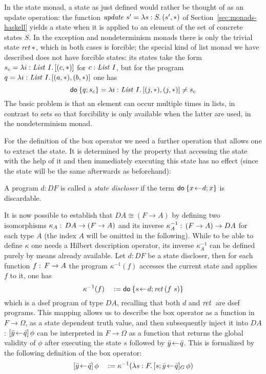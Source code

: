 In the state monad, a state as just defined would rather be thought of as an
update operation: the function $\mathit{update}\ s' = {\lambda s:S.\,(s',
  \ast)}$ of Section~\ref{sec:monads-haskell} yields a state when it is applied
to an element of the  set of concrete states $S$. In the exception and
nondeterminism monads there is only the trivial state $\mathit{ret\,} \ast$, which in
both cases is forcible; the special kind of list monad we have described does
not have forcible states: its states take the form $s_c = {\lambda i :
  \mathit{List}\ I.\,[(c, \ast)]}$ for $c : \mathit{List}\ I$, but for the program
$q = {\lambda i:\mathit{List}\ I.\,[(a, \ast), (b, \ast)]}$ one has
\[
  \mathsf{do}\: \{q; s_c\} = {\lambda i:\mathit{List}\ I.\,[(j,\ast), (j,\ast)]} \neq s_c
\]
The basic problem is that an element can occur multiple times in lists, in
contrast to sets so that forcibility is only available when the latter are used,
\EG in the nondeterminism monad.


For the definition of the box operator we need a further operation that allows
one to extract the state. It is determined by the property that accessing the
state with the help of it and then immediately executing this state has no effect
(since the state will be the same afterwards as beforehand):
\begin{defn}
  A program $d : DF$ is called a \emph{state discloser} if the term
  $\mathsf{do}\: \{x\!\gets\! d; x\}$ is discardable.
\end{defn}

It is now possible to establish that $D A \cong (F \to A)$ by defining two
isomorphisms $\kappa_A :\, D A \to (F \to A)$ and its inverse $\kappa^{-1}_A :\, (F \to A) \to D
  A$ for each type $A$ (the index $A$ will be omitted in the following). While
to be able to define $\kappa$ one needs a Hilbert description operator, its inverse
$\kappa^{-1}_A$ can be defined purely by means already available. Let $d : DF$ be a
state discloser, then for each function $f :\, F \to A$ the program $\kappa^{-1}(f)$
accesses the current state and applies $f$ to it, \IE one has
\[
  \kappa^{-1}( f )\quad :=  \mathsf{do}\: \{s\!\gets\! d; \mathit{ret\,} (f~s)\}
\]
which is a dsef program of type $D A$, recalling that both $d$ and $\mathit{ret\,}$ are
dsef programs. This mapping allows us to describe the box operator as a function
in $F \to \Omega$, \IE as a state dependent truth value, and then subsequently inject
it into $D A$: $[\bar y\!\gets\!\bar q]\,{\phi}$ can be interpreted in $F\to\Omega$ as a
function that returns the global validity of $\phi$ after executing the state $s$
followed by $\bar y\!\gets\!\bar q$. This is formalized by the following definition
of the box operator:
\[
[\bar y\!\gets\!\bar q]\,\phi \quad:= \kappa^{-1} ({\lambda s: F.\,[s; \bar
    y\!\gets\!\bar q]_G\,\phi})
\]

